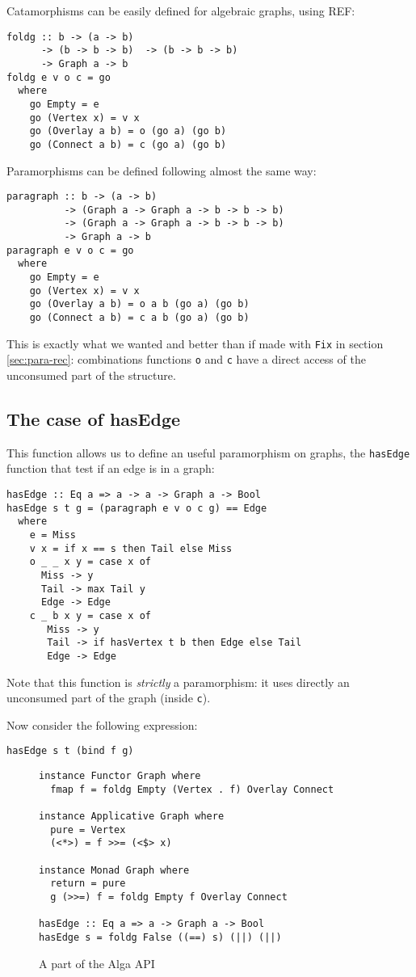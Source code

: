 \documentclass[format=sigplan]{acmart}
\newcommand{\minline}[1]{\texttt{#1}}
\begin{document}
Catamorphisms can be easily defined for algebraic graphs, using REF:
\begin{verbatim}
foldg :: b -> (a -> b)
      -> (b -> b -> b)  -> (b -> b -> b) 
      -> Graph a -> b
foldg e v o c = go
  where
    go Empty = e
    go (Vertex x) = v x
    go (Overlay a b) = o (go a) (go b)
    go (Connect a b) = c (go a) (go b)
\end{verbatim}

Paramorphisms can be defined following almost the same way:
\begin{verbatim}
paragraph :: b -> (a -> b) 
          -> (Graph a -> Graph a -> b -> b -> b) 
          -> (Graph a -> Graph a -> b -> b -> b) 
          -> Graph a -> b
paragraph e v o c = go
  where
    go Empty = e
    go (Vertex x) = v x
    go (Overlay a b) = o a b (go a) (go b)
    go (Connect a b) = c a b (go a) (go b)
\end{verbatim}

This is exactly what we wanted and better than if made with \minline{Fix} in section \ref{sec:para-rec}: combinations functions \minline{o} and \minline{c} have a direct access of the unconsumed part of the structure.

\subsection{The case of hasEdge}

This function allows us to define an useful paramorphism on graphs, the \minline{hasEdge} function that test if an edge is in a graph:

\begin{verbatim}
hasEdge :: Eq a => a -> a -> Graph a -> Bool
hasEdge s t g = (paragraph e v o c g) == Edge
  where
    e = Miss
    v x = if x == s then Tail else Miss
    o _ _ x y = case x of
      Miss -> y
      Tail -> max Tail y
      Edge -> Edge
    c _ b x y = case x of
       Miss -> y
       Tail -> if hasVertex t b then Edge else Tail
       Edge -> Edge
\end{verbatim}

Note that this function is \emph{strictly} a paramorphism: it uses directly an unconsumed part of the graph (inside \minline{c}).

Now consider the following expression:
\begin{verbatim}
hasEdge s t (bind f g)
\end{verbatim}

\begin{figure*}
\begin{verbatim}
instance Functor Graph where
  fmap f = foldg Empty (Vertex . f) Overlay Connect

instance Applicative Graph where
  pure = Vertex
  (<*>) = f >>= (<$> x)

instance Monad Graph where
  return = pure
  g (>>=) f = foldg Empty f Overlay Connect
  
hasEdge :: Eq a => a -> Graph a -> Bool
hasEdge s = foldg False ((==) s) (||) (||)
\end{verbatim}
\caption{A part of the Alga API}
\end{figure*}
\end{document}
